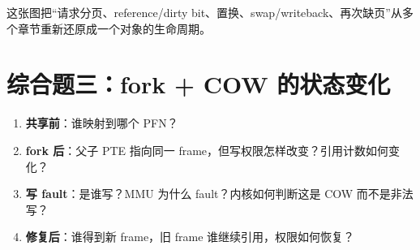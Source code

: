 \documentclass[11pt,a4paper]{ctexart}
\newcommand{\kw}[1]{\textbf{#1}}
\begin{document}
这张图把“请求分页、reference/dirty bit、置换、swap/writeback、再次缺页”从多个章节重新还原成一个对象的生命周期。

\section{综合题三：fork + COW 的状态变化}
\begin{method}
\begin{enumerate}
  \item \kw{共享前}：谁映射到哪个 PFN？
  \item \kw{fork 后}：父子 PTE 指向同一 frame，但写权限怎样改变？引用计数如何变化？
  \item \kw{写 fault}：是谁写？MMU 为什么 fault？内核如何判断这是 COW 而不是非法写？
  \item \kw{修复后}：谁得到新 frame，旧 frame 谁继续引用，权限如何恢复？
\end{enumerate}
\end{method}
\end{document}
